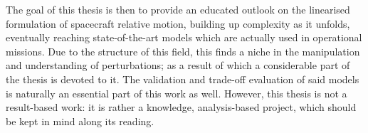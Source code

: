 %
\indent The goal of this thesis is then to provide an educated outlook on the linearised formulation of spacecraft relative motion, building up complexity as it unfolds, eventually reaching state-of-the-art models which are actually used in operational missions. Due to the structure of this field, this finds a niche in the manipulation and understanding of perturbations; as a result of which a considerable part of the thesis is devoted to it. The validation and trade-off evaluation of said models is naturally an essential part of this work as well. However, this thesis is not a result-based work: it is rather a knowledge, analysis-based project, which should be kept in mind along its reading.
%